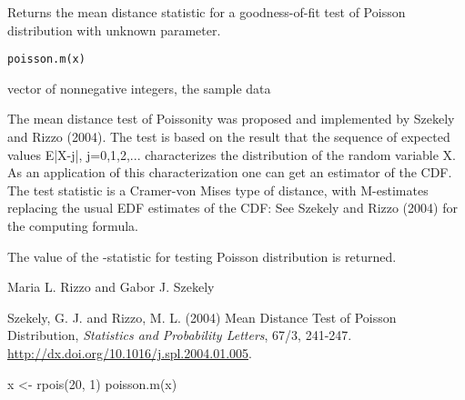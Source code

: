 \begin{Description}\relax
Returns the mean distance statistic for a goodness-of-fit test of Poisson distribution with unknown parameter.
\end{Description}
\begin{Usage}
\begin{verbatim}
poisson.m(x)
\end{verbatim}
\end{Usage}
\begin{Arguments}
\begin{ldescription}
\item[\code{x}] vector of nonnegative integers, the sample data 
\end{ldescription}
\end{Arguments}
\begin{Details}\relax
The mean distance test of Poissonity was proposed and implemented by Szekely and Rizzo (2004). The test is based on the result that the sequence of expected values E|X-j|, j=0,1,2,... characterizes the distribution of the random variable X. As an application of this characterization one can get an estimator  of the CDF. The test statistic is a Cramer-von Mises type of distance, with M-estimates replacing the usual EDF estimates of the CDF: 
 See Szekely and Rizzo (2004) for the computing formula.
\end{Details}
\begin{Value}
The value of the -statistic for testing Poisson distribution is returned.\end{Value}
\begin{Author}\relax
Maria L. Rizzo  and
Gabor J. Szekely 
\end{Author}
\begin{References}\relax
Szekely, G. J. and Rizzo, M. L. (2004) Mean Distance Test of Poisson Distribution, \emph{Statistics and Probability Letters}, 
67/3, 241-247. \url{http://dx.doi.org/10.1016/j.spl.2004.01.005}.
\end{References}
\begin{SeeAlso}\relax
{}
\end{SeeAlso}
\begin{Examples}
\begin{ExampleCode}
 x <- rpois(20, 1)
poisson.m(x)
 \end{ExampleCode}
\end{Examples}

